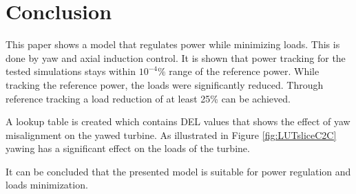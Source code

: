 \section{Conclusion}
This paper shows a model that regulates power while minimizing loads. This is done by yaw and axial induction control. It is shown that power tracking for the tested simulations stays within $10^{-4}\%$ range of the reference power. While tracking the reference power, the loads were significantly reduced.
Through reference tracking a load reduction of at least 25\% can be achieved.
 
A lookup table is created which contains DEL values that shows the effect of yaw misalignment on the yawed turbine. As illustrated in Figure \ref{fig:LUTsliceC2C} yawing has a significant effect on the loads of the turbine.

It can be concluded that the presented model is suitable for power regulation and loads minimization. 